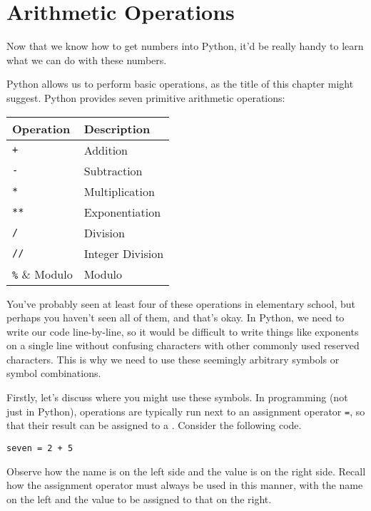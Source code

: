 \section{Arithmetic Operations}
Now that we know how to get numbers into Python, it'd be really handy to learn what we can do with these numbers.\par
Python allows us to perform basic  operations, as the title of this chapter might suggest. Python provides seven primitive arithmetic operations:\par
\vspace{5mm}
\begin{tabular}{|l|l|}
\hline
Operation & Description      \\
\hline
\verb|+|  & Addition         \\
\hline
\verb|-|  & Subtraction      \\
\hline
\verb|*|  & Multiplication   \\
\hline
\verb|**| & Exponentiation   \\
\hline
\verb|/|  & Division         \\
\hline
\verb|//| & Integer Division \\
\hline
\verb|%| & Modulo           \\
\hline
\end{tabular}\par
\vspace{5mm}
You've probably seen at least four of these operations in elementary school, but perhaps you haven't seen all of them, and that's okay. In Python, we need to write our code line-by-line, so it would be difficult to write things like exponents on a single line without confusing characters with other commonly used reserved characters. This is why we need to use these seemingly arbitrary symbols or symbol combinations.\par
Firstly, let's discuss where you might use these symbols. In programming (not just in Python),  operations are typically run next to an assignment operator \verb|=|, so that their result can be assigned to a . Consider the following code.
\begin{lstlisting}[style=pippython]
seven = 2 + 5
\end{lstlisting}
Observe how the  name is on the left side and the value is on the right side. Recall how the assignment operator must always be used in this manner, with the  name on the left and the value to be assigned to that  on the right.\par
